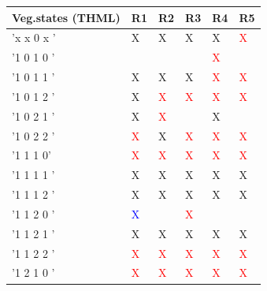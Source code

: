 \documentclass[preprint,3p,times,twocolumn]{elsarticle}
\begin{document}
\begin{table}[h]
	\begin{center}
		\begin{tabular}{|p{}|p{0,5cm}|p{}|p{}|p{}|p{}|}
			\hline 
			Veg.states (THML)                & R1 	            & R2                 & R3              & R4              & R5               \\ \hline
			'x x 0 x '     & X                     & X                     & X                  & X                  & \textcolor{red}{X}  \\
			\rowcolor{yellow} '1 0 1 0 '     &                       &                       &                    & \textcolor{red}{X} &                     \\
			'1 0 1 1 '     & X                     & X                     & X                  & \textcolor{red}{X} & \textcolor{red}{X}  \\
			'1 0 1 2 '     & X                     & \textcolor{red}{X}    & \textcolor{red}{X} & \textcolor{red}{X} & \textcolor{red}{X}  \\
			'1 0 2 1 '     & X                     & \textcolor{red}{X}    &                    & X                  &                     \\
			'1 0 2 2 '     & \textcolor{red}{X}    & X                     & \textcolor{red}{X} & \textcolor{red}{X} & \textcolor{red}{X}  \\
			\rowcolor{yellow} '1 1 1 0'      & \textcolor{red}{X}    & \textcolor{red}{X}    & \textcolor{red}{X} & \textcolor{red}{X} & \textcolor{red}{X}  \\
			'1 1 1 1 '     & X                     & X                     & X                  & X                  & X                   \\
			'1 1 1 2 '     & X                     & X                     & X                  & X                  & X                   \\
			'1 1 2 0 '     & \textcolor{blue}{X}   &                       & \textcolor{red}{X} &                    &                     \\
			'1 1 2 1 '     & X                     & X                     & X                  & X                  & X                   \\
			'1 1 2 2 '     & \textcolor{red}{X}    & \textcolor{red}{X}    & \textcolor{red}{X} & \textcolor{red}{X} & \textcolor{red}{X}  \\
			\rowcolor{yellow} '1 2 1 0 '     & \textcolor{red}{X}    & \textcolor{red}{X}    & \textcolor{red}{X} & \textcolor{red}{X} & \textcolor{red}{X}  \\

\end{tabular}
\end{center}
\end{table}
\end{document}
